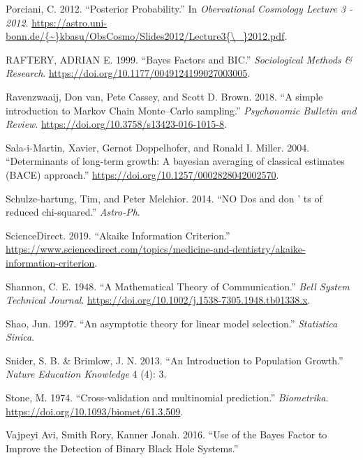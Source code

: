 \documentclass[]{article}
\begin{document}
\leavevmode\hypertarget{ref-Porciani2012}{}%
Porciani, C. 2012. ``Posterior Probability.'' In \emph{Obervational
Cosmology Lecture 3 - 2012}.
\href{https://astro.uni-bonn.de/\%7B~\%7Dkbasu/ObsCosmo/Slides2012/Lecture3\%7B/_\%7D2012.pdf}{https://astro.uni-bonn.de/\{\textasciitilde{}\}kbasu/ObsCosmo/Slides2012/Lecture3\{\textbackslash{}\_\}2012.pdf}.

\leavevmode\hypertarget{ref-RAFTERY1999}{}%
RAFTERY, ADRIAN E. 1999. ``Bayes Factors and BIC.'' \emph{Sociological
Methods \& Research}. \url{https://doi.org/10.1177/0049124199027003005}.

\leavevmode\hypertarget{ref-VanRavenzwaaij2018}{}%
Ravenzwaaij, Don van, Pete Cassey, and Scott D. Brown. 2018. ``A simple
introduction to Markov Chain Monte--Carlo sampling.'' \emph{Psychonomic
Bulletin and Review}. \url{https://doi.org/10.3758/s13423-016-1015-8}.

\leavevmode\hypertarget{ref-Sala-i-Martin2004}{}%
Sala-i-Martin, Xavier, Gernot Doppelhofer, and Ronald I. Miller. 2004.
``Determinants of long-term growth: A bayesian averaging of classical
estimates (BACE) approach.''
\url{https://doi.org/10.1257/0002828042002570}.

\leavevmode\hypertarget{ref-Schulze-hartung2014}{}%
Schulze-hartung, Tim, and Peter Melchior. 2014. ``NO Dos and don ' ts of
reduced chi-squared.'' \emph{Astro-Ph}.

\leavevmode\hypertarget{ref-ScienceDirect2019}{}%
ScienceDirect. 2019. ``Akaike Information Criterion.''
\url{https://www.sciencedirect.com/topics/medicine-and-dentistry/akaike-information-criterion}.

\leavevmode\hypertarget{ref-Shannon1948}{}%
Shannon, C. E. 1948. ``A Mathematical Theory of Communication.''
\emph{Bell System Technical Journal}.
\url{https://doi.org/10.1002/j.1538-7305.1948.tb01338.x}.

\leavevmode\hypertarget{ref-Shao1997}{}%
Shao, Jun. 1997. ``An asymptotic theory for linear model selection.''
\emph{Statistica Sinica}.

\leavevmode\hypertarget{ref-Snider2013}{}%
Snider, S. B. \& Brimlow, J. N. 2013. ``An Introduction to Population
Growth.'' \emph{Nature Education Knowledge} 4 (4): 3.

\leavevmode\hypertarget{ref-Stone1974}{}%
Stone, M. 1974. ``Cross-validation and multinomial prediction.''
\emph{Biometrika}. \url{https://doi.org/10.1093/biomet/61.3.509}.

\leavevmode\hypertarget{ref-VajpeyiAviSmithRory2016}{}%
Vajpeyi Avi, Smith Rory, Kanner Jonah. 2016. ``Use of the Bayes Factor
to Improve the Detection of Binary Black Hole Systems.''
\end{document}
